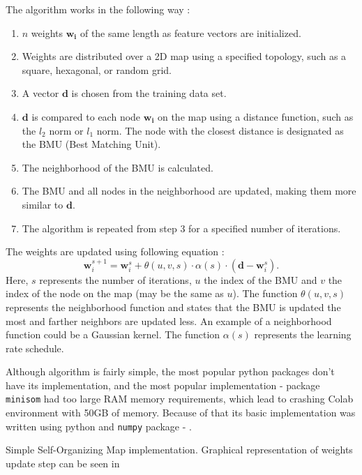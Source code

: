 The algorithm works in the following way \cite{somTutorial}: 
\begin{enumerate}
    \item $n$ weights $\mathbf{w_i}$ of the same length as feature vectors are initialized.
    \item Weights are distributed over a 2D map using a specified topology, such as a square, hexagonal, or random grid.
    \item A vector $\mathbf{d}$ is chosen from the training data set.
    \item $\mathbf{d}$ is compared to each node $\mathbf{w_i}$ on the map using a distance function, such as the $l_2$ norm or $l_1$ norm. The node with the closest distance is designated as the BMU (Best Matching Unit).
    \item The neighborhood of the BMU is calculated.
    \item The BMU and all nodes in the neighborhood are updated, making them more similar to $\mathbf{d}$.
    \item The algorithm is repeated from step 3 for a specified number of iterations.
\end{enumerate}

The weights are updated using following equation \cite{somWikipedia}:
\[\mathbf{w}_i^{s+1} = \mathbf{w}_i^s + \theta(u, v, s) \cdot \alpha(s) \cdot (\mathbf{d} - \mathbf{w}_i^s).\]
Here, $s$ represents the number of iterations, $u$ the index of the BMU and $v$ the index of the node on the map (may be the same as $u$). 
The function $\theta(u, v, s)$ represents the neighborhood function and states that the BMU is updated the most and farther neighbors are updated less. 
An example of a neighborhood function could be a Gaussian kernel. 
The function $\alpha(s)$ represents the learning rate schedule.

Although algorithm is fairly simple, the most popular python packages don't have its implementation, and the most popular implementation - package \texttt{minisom} had too large RAM memory requirements, which lead to crashing Colab environment with 50GB of memory.
Because of that its basic implementation was written using python and \texttt{numpy} package - . 

\newenvironment{longlistingB}{\captionsetup{type=listing, width=0.8\textwidth}}{}

\begin{longlistingB}
    \caption{Simple Self-Organizing Map implementation. Graphical representation of weights update step can be seen in }
    \label{lst:som}
\end{longlistingB}
\vspace{12pt}

